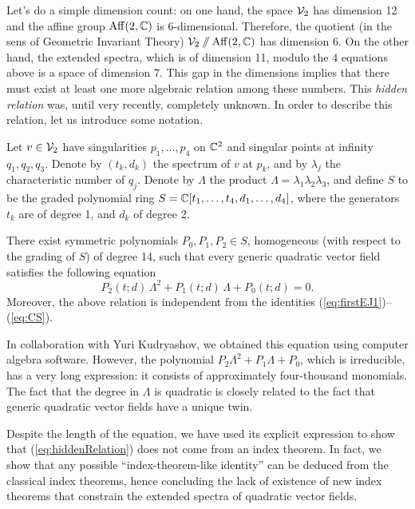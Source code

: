 \documentclass[phd,tocprelim]{cornell}
\begin{document}
Let's do a simple dimension count: on one hand, the space $\mathcal{V}_2$ has dimension 12 and the affine group $\operatorname{Aff}({2},{\mathbb{C}})$ is 6-dimensional. Therefore, the quotient (in the sens of Geometric Invariant Theory) $\mathcal{V}_2\sslash\operatorname{Aff}({2},{\mathbb{C}})$ has dimension 6. On the other hand, the extended spectra, which is of dimension 11, modulo the 4 equations above is a space of dimension 7. This gap in the dimensions implies that there must exist at least one more algebraic relation among these numbers. This \textit{hidden relation} was, until very recently, completely unknown. In order to describe this relation, let us introduce some notation.

Let $v\in\mathcal{V}_2$ have singularities $p_1,\ldots,p_4$ on $\mathbb{C}^2$ and singular points at infinity $q_1,q_2,q_3$. Denote by $(t_k,d_k)$ the spectrum of $v$ at $p_k$, and by $\lambda_j$ the characteristic number of $q_j$. Denote by $\Lambda$ the product $\Lambda=\lambda_1\lambda_2\lambda_3$, and define $S$ to be the graded polynomial ring $S=\mathbb{C}[t_1,\ldots,t_4,d_1,\ldots,d_4]$, where the generators $t_k$ are of degree 1, and $d_k$ of degree 2.

\begin{theorem}\label{thm:hiddenRelation}
 There exist symmetric polynomials $P_0,P_1,P_2\in S$, homogeneous (with respect to the grading of $S$) of degree 14, such that every generic quadratic vector field satisfies the following equation
  \begin{equation}\label{eq:hiddenRelation}
   P_2(t;d)\,\Lambda^2+P_1(t;d)\,\Lambda+P_0(t;d)=0 .
  \end{equation}
 Moreover, the above relation is independent from the identities (\ref{eq:firstEJ1})--(\ref{eq:CS}).
\end{theorem}

In collaboration with Yuri Kudryashov, we obtained this equation using computer algebra software. However, the polynomial $P_2\Lambda^2+P_1\Lambda+P_0$, which is irreducible, has a very long expression: it consists of approximately four-thousand monomials. The fact that the degree in $\Lambda$ is quadratic is closely related to the fact that generic quadratic vector fields have a unique twin. 

Despite the length of the equation, we have used its explicit expression to show that (\ref{eq:hiddenRelation}) does not come from an index theorem. In fact, we show that any possible ``index-theorem-like identity'' can be deduced from the classical index theorems, hence concluding the lack of existence of new index theorems that constrain the extended spectra of quadratic vector fields.
\end{document}
